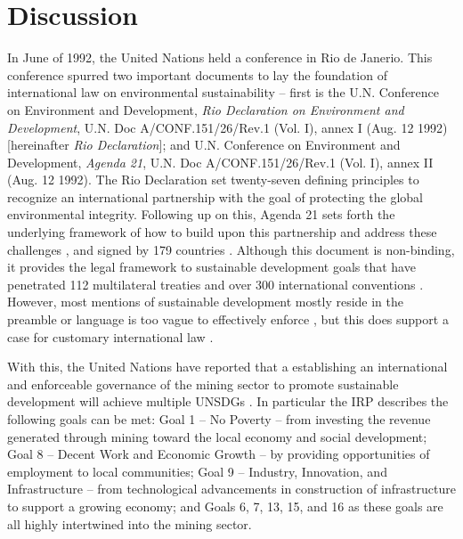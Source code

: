 \documentclass[12pt]{article}
\begin{document}
\section{Discussion}
In June of 1992, the United Nations held a conference in Rio de Janerio. This conference spurred two important documents to lay the foundation of international law on environmental sustainability -- first is the U.N. Conference on Environment and Development, \textit{Rio Declaration on Environment and Development}, U.N. Doc A/CONF.151/26/Rev.1 (Vol. I), annex I (Aug. 12 1992) [hereinafter \textit{Rio Declaration}]; and U.N. Conference on Environment and Development, \textit{Agenda 21}, U.N. Doc A/CONF.151/26/Rev.1 (Vol. I), annex II (Aug. 12 1992). The Rio Declaration set twenty-seven defining principles to recognize an international partnership with the goal of protecting the global environmental integrity. Following up on this, Agenda 21 sets forth the underlying framework of how to build upon this partnership and address these challenges \cite{Website:United_Nations_Conference}, and signed by 179 countries \cite{Website:United_Nations_Conference}. Although this document is non-binding, it provides the legal framework to sustainable development goals that have penetrated 112 multilateral treaties and over 300 international conventions \cite{Article:Development_International_Law}. However, most mentions of sustainable development mostly reside in the preamble or language is too vague to effectively enforce \cite{Article:Development_International_Law}, but this does support a case for customary international law \cite{Article:Development_International_Law}.

With this, the United Nations have reported that a establishing an international and enforceable governance of the mining sector to promote sustainable development will achieve multiple UNSDGs \cite{Book:MRG_Sustainable_Report}. In particular the IRP describes the following goals can be met: Goal 1 -- No Poverty -- from investing the revenue generated through mining toward the local economy and social development; Goal 8 -- Decent Work and Economic Growth -- by providing opportunities of employment to local communities; Goal 9 -- Industry, Innovation, and Infrastructure -- from technological advancements in construction of infrastructure to support a growing economy; and Goals 6, 7, 13, 15, and 16 \cite{Book:MRG_Sustainable_Report} as these goals are all highly intertwined into the mining sector.
\end{document}
